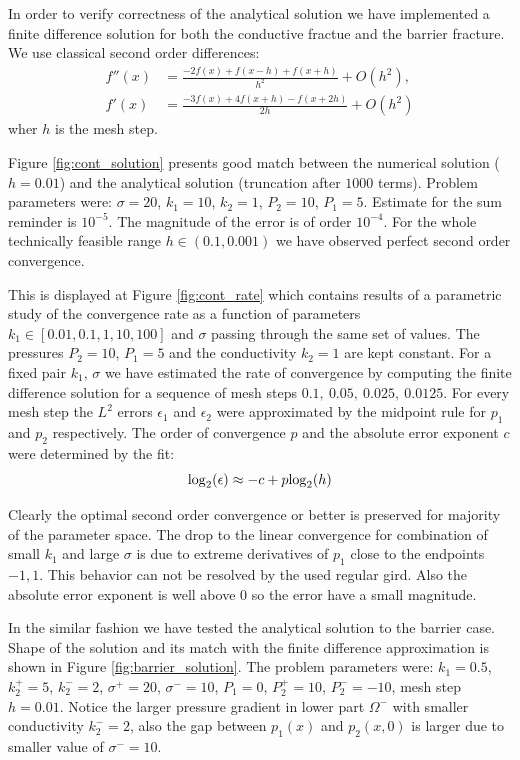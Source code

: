 \documentclass[a4paper,10pt]{article}
\def\log{{\rm log}}
\begin{document}
In order to verify correctness of the analytical solution we have implemented a finite difference solution for both the conductive fractue 
and the barrier fracture. We use classical second order differences:
\begin{align*}
    f''(x) &= \frac{-2 f(x) + f(x-h) + f(x+h)}{h^2} + O(h^2),\\
    f'(x) &= \frac{-3 f(x) + 4f(x+h) - f(x+2h)}{2h} + O(h^2)
\end{align*}
wher $h$ is the mesh step.

Figure \ref{fig:cont_solution} presents good match between the numerical solution ($h=0.01$) and the analytical solution (truncation after $1000$ terms). 
Problem parameters were: $\sigma=20$, $k_1=10$, $k_2=1$, $P_2=10$, $P_1=5$.
Estimate for the sum reminder is $10^{-5}$. The magnitude of the error is of order $10^{-4}$. For the whole technically feasible range $h\in (0.1, 0.001)$ 
we have observed perfect second order convergence. 

This is displayed at Figure \ref{fig:cont_rate} which contains results of a parametric study of the 
convergence rate as a function of parameters $k_1 \in [0.01, 0.1, 1, 10, 100]$ and $\sigma$ passing through the same set of values. The pressures $P_2=10$, $P_1=5$
and the conductivity $k_2=1$ are kept constant. For a fixed pair $k_1$, $\sigma$ we have estimated the rate of convergence by computing the finite difference solution for a sequence  
of mesh steps $0.1,\ 0.05,\ 0.025,\ 0.0125$. For every mesh step the $L^2$ errors $\epsilon_1$ and $\epsilon_2$ were approximated by the midpoint rule 
for $p_1$ and $p_2$ respectively. The order of convergence $p$ and the absolute error exponent $c$ were determined by the fit:
\[
        \log_2(\epsilon) \approx -c + p\log_2(h) 
\]

Clearly the optimal second order convergence or better is preserved for majority of the parameter space. The drop to the linear convergence for combination 
of small $k_1$ and large $\sigma$ is due to extreme derivatives of $p_1$ close to the endpoints ${-1, 1}$. This behavior can not be resolved by the used regular gird.
Also the absolute error exponent is well above $0$ so the error have a small magnitude. 

In the similar fashion we have tested the analytical solution to the barrier case. Shape of the solution and its match with the finite difference approximation 
is shown in Figure \ref{fig:barrier_solution}. The problem parameters were: $k_1=0.5$, $k_2^+=5$, $k_2^-=2$, $\sigma^+=20$, $\sigma^-=10$, $P_1=0$, 
$P_2^+=10$, $P_2^-=-10$, mesh step $h=0.01$. Notice the larger pressure gradient in lower part $\Omega^-$ with smaller conductivity $k_2^- = 2$, also the gap between 
$p_1(x)$ and $p_2(x, 0)$ is larger due to smaller value of $\sigma^- = 10$. 
\end{document}
